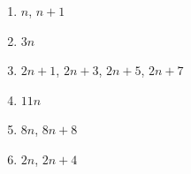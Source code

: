 %
%
  \begin{enumerate}[cols=2]
    \item $n$, $n+1$
    \item $3n$
    \item $2n+1$, $2n+3$, $2n+5$, $2n+7$
    \item $11n$
    \item $8n$, $8n+8$
    \item $2n$, $2n+4$
  \end{enumerate}
